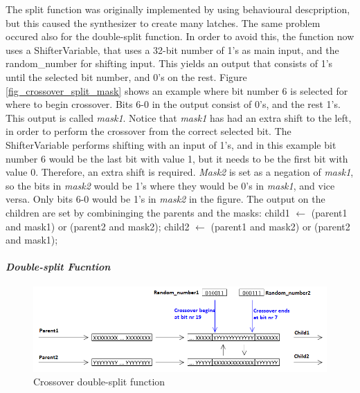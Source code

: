 The split function was originally implemented by using behavioural descpription, but this caused the synthesizer to create many latches.
The same problem occured also for the double-split function.
In order to avoid this, the function now uses a ShifterVariable, that uses a 32-bit number of 1's as main input, and the random\_number for shifting input.
This yields an output that consists of 1's until the selected bit number, and 0's on the rest.
Figure \ref{fig_crossover_split_mask} shows an example where bit number 6 is selected for where to begin crossover. 
Bits 6-0 in the output consist of 0's, and the rest 1's.
This output is called \emph{mask1}. Notice that \emph{mask1} has had an extra shift to the left, in order to perform the crossover from the correct selected bit. 
The ShifterVariable performs shifting with an input of 1's, and in this example bit number 6 would be the last bit with value 1, but it needs to be the first bit with value 0. Therefore, an extra shift is required.
\emph{Mask2} is set as a negation of \emph{mask1}, so the bits in \emph{mask2} would be 1's where they would be 0's in \emph{mask1}, and vice versa.
Only bits 6-0 would be 1's in \emph{mask2} in the figure.
The output on the children are set by combininging the parents and the masks:
\linebreak
\linebreak child1 $\leftarrow$ (parent1 and mask1) or (parent2 and mask2);
\linebreak child2 $\leftarrow$ (parent1 and mask2) or (parent2 and mask1);
\linebreak {}

\paragraph{\textit{Double-split Fucntion}}
\begin{figure}[H]
\includegraphics[width=\textwidth]{fpga/fig/crossover_doublesplit.png}
\caption{Crossover double-split function}
\label{fig_crossover_doublesplit}
\end{figure}


